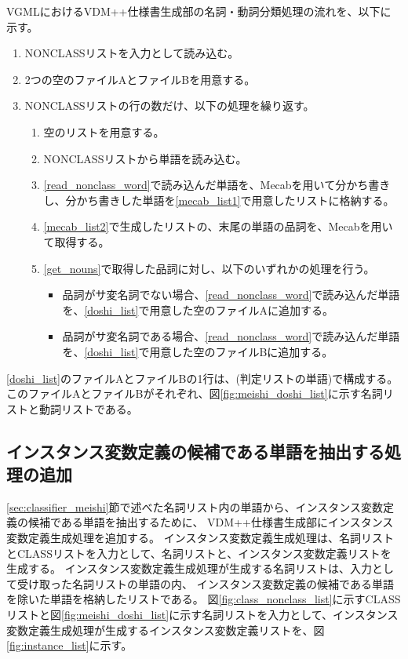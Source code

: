 VGMLにおけるVDM++仕様書生成部の名詞・動詞分類処理の流れを、以下に示す。

\begin{enumerate}
    \item NONCLASSリストを入力として読み込む。
    \item 2つの空のファイルAとファイルBを用意する。
    \label{doshi_list}
    \item NONCLASSリストの行の数だけ、以下の処理を繰り返す。
        \begin{enumerate}
            \item 空のリストを用意する。
            \label{mecab_list1}
            \item NONCLASSリストから単語を読み込む。
            \label{read_nonclass_word}
            \item \ref{read_nonclass_word}で読み込んだ単語を、Mecabを用いて分かち書きし、分かち書きした単語を\ref{mecab_list1}で用意したリストに格納する。
            \label{mecab_list2}
            \item \ref{mecab_list2}で生成したリストの、末尾の単語の品詞を、Mecabを用いて取得する。
            \label{get_nouns}
            \item \ref{get_nouns}で取得した品詞に対し、以下のいずれかの処理を行う。
                \begin{itemize}
                    \item 品詞がサ変名詞でない場合、\ref{read_nonclass_word}で読み込んだ単語を、\ref{doshi_list}で用意した空のファイルAに追加する。
                    \item 品詞がサ変名詞である場合、\ref{read_nonclass_word}で読み込んだ単語を、\ref{doshi_list}で用意した空のファイルBに追加する。
                \end{itemize}
        \end{enumerate}
\end{enumerate}

\ref{doshi_list}のファイルAとファイルBの1行は、(判定リストの単語)で構成する。
このファイルAとファイルBがそれぞれ、図\ref{fig:meishi_doshi_list}に示す名詞リストと動詞リストである。

\subsection{インスタンス変数定義の候補である単語を抽出する処理の追加}
\ref{sec:classifier_meishi}節で述べた名詞リスト内の単語から、インスタンス変数定義の候補である単語を抽出するために、
VDM++仕様書生成部にインスタンス変数定義生成処理を追加する。
インスタンス変数定義生成処理は、名詞リストとCLASSリストを入力として、名詞リストと、インスタンス変数定義リストを生成する。
インスタンス変数定義生成処理が生成する名詞リストは、入力として受け取った名詞リストの単語の内、
インスタンス変数定義の候補である単語を除いた単語を格納したリストである。
図\ref{fig:class_nonclass_list}に示すCLASSリストと図\ref{fig:meishi_doshi_list}に示す名詞リストを入力として、インスタンス変数定義生成処理が生成するインスタンス変数定義リストを、図\ref{fig:instance_list}に示す。

